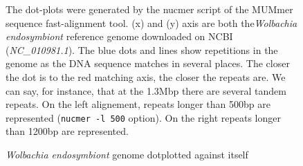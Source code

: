 \documentclass[12pt]{article}
\begin{document}
\begin{figure}[h!]
\begin{center}
{
}
\end{center}
\caption{\textit{Wolbachia endosymbiont} genome dotplotted against itself}
{\footnotesize The dot-plots were generated by the nucmer script of the MUMmer sequence fast-alignment tool. (x) and (y) axis are both the\textit{Wolbachia endosymbiont} reference genome downloaded on NCBI 
(\textit{NC\_010981.1}). The blue dots and lines show repetitions in the genome as the DNA sequence matches in several places. The closer the dot is to the red matching axis, the closer the repeats are. We can say, for instance, that at the 1.3Mbp there are several tandem repeats. On the left alignement, repeats longer than 500bp are represented (\texttt{nucmer -l 500} option). On the right repeats longer than 1200bp are represented.}
\label{fig:wolbarepeats}
\end{figure}
\newpage
\end{document}
